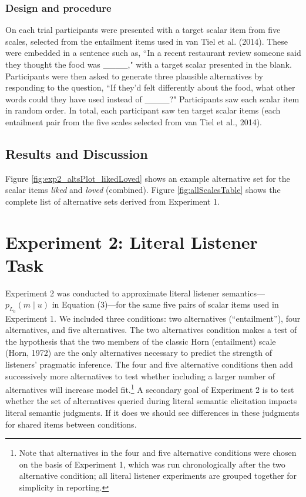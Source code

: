 \documentclass[10pt, letterpaper]{article}
\begin{document}
\subsubsection{Design and procedure}\label{design-and-procedure}

On each trial participants were presented with a target scalar item from
five scales, selected from the entailment items used in van Tiel et al.
(2014). These were embedded in a sentence such as, ``In a recent
restaurant review someone said they thought the food was \_\_\_\_," with
a target scalar presented in the blank. Participants were then asked to
generate three plausible alternatives by responding to the question,
``If they'd felt differently about the food, what other words could they
have used instead of \_\_\_\_?" Participants saw each scalar item in
random order. In total, each participant saw ten target scalar items
(each entailment pair from the five scales selected from van Tiel et
al., 2014).

\subsection{Results and Discussion}\label{results-and-discussion}

Figure \ref{fig:exp2_altsPlot_likedLoved} shows an example alternative
set for the scalar items \emph{liked} and \emph{loved} (combined).
Figure \ref{fig:allScalesTable} shows the complete list of alternative
sets derived from Experiment 1.

\section{Experiment 2: Literal Listener
Task}\label{experiment-2-literal-listener-task}

Experiment 2 was conducted to approximate literal listener
semantics---\(p_{L_0}(m \mid u)\) in Equation (3)---for the same five
pairs of scalar items used in Experiment 1. We included three
conditions: two alternatives (``entailment''), four alternatives, and
five alternatives. The two alternatives condition makes a test of the
hypothesis that the two members of the classic Horn (entailment) scale
(Horn, 1972) are the only alternatives necessary to predict the strength
of listeners' pragmatic inference. The four and five alternative
conditions then add successively more alternatives to test whether
including a larger number of alternatives will increase model
fit.\footnote{Note that alternatives in the four and five alternative conditions were chosen on the basis of Experiment 1, which was run chronologically after the two alternative condition; all literal listener experiments are grouped together for simplicity in reporting.}
A secondary goal of Experiment 2 is to test whether the set of
alternatives queried during literal semantic elicitation impacts literal
semantic judgments. If it does we should see differences in these
judgments for shared items between conditions.
\end{document}
